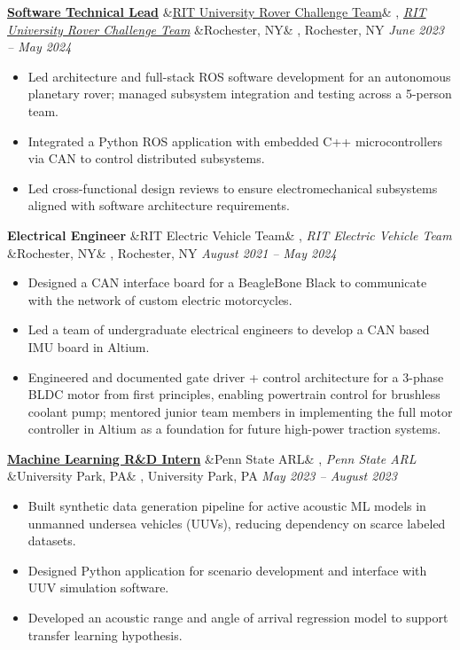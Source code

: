 \documentclass[letterpaper,10pt]{article}
\newcommand{\experience}[5]{%
    \noindent\textbf{#1}%
    \ifx&#2&
    \else
        , \textit{#2}%
    \fi
    \ifx&#3&
    \else
        , #3%
    \fi
    \hfill \textit{#4} \\
    \vspace{-6.8mm}%
    \begin{itemize}[itemsep=-5pt]
        \setlength{\itemindent}{0em}
        #5
    \end{itemize}
    \vspace{1mm}
}
\begin{document}
\experience
    {\href{https://ryanbarry.me/projects/robotics/rover/}{Software Technical Lead}}
    {\href{https://ryanbarry.me/projects/robotics/rover/}{RIT University Rover Challenge Team}}
    {Rochester, NY}
    {June 2023 – May 2024}
    {
        \item Led architecture and full-stack ROS software development for an autonomous planetary rover; managed subsystem integration and testing across a 5-person team.
        \item Integrated a Python ROS application with embedded C++ microcontrollers via CAN to control distributed subsystems.
        \item Led cross-functional design reviews to ensure electromechanical subsystems aligned with software architecture requirements.
    }

\experience
    {Electrical Engineer}
    {RIT Electric Vehicle Team}
    {Rochester, NY}
    {August 2021 – May 2024}
    {
        \item Designed a CAN interface board for a BeagleBone Black to communicate with the network of custom electric motorcycles.
        \item Led a team of undergraduate electrical engineers to develop a CAN based IMU board in Altium. 
        \item Engineered and documented gate driver + control architecture for a 3-phase BLDC motor from first principles, enabling powertrain control for brushless coolant pump; mentored junior team members in implementing the full motor controller in Altium as a foundation for future high-power traction systems.

    }

\experience
    {\href{https://ryanbarry.me/projects/ai-ml/sonar-data-pipeline/}{Machine Learning R\&D Intern}}
    {Penn State ARL}
    {University Park, PA}
    {May 2023 – August 2023}
    {
        \item Built synthetic data generation pipeline for active acoustic ML models in unmanned undersea vehicles (UUVs), reducing dependency on scarce labeled datasets.
        \item Designed Python application for scenario development and interface with UUV simulation software.
        \item Developed an acoustic range and angle of arrival regression model to support transfer learning hypothesis.
    }
\end{document}
